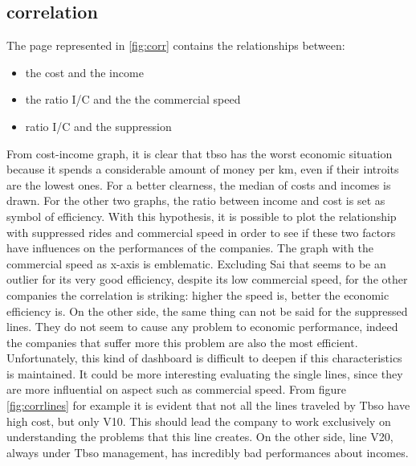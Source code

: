 \subsection{correlation}
The page represented in \ref{fig:corr} contains the relationships between:
\begin{itemize}
  \item the cost and the income
   \item the ratio I/C and the the commercial speed
    \item ratio I/C and the suppression
\end{itemize}
From cost-income graph, it is clear that tbso has the worst economic situation because it spends a considerable amount of money per km, even if their introits are the lowest ones. For a better clearness, the median of costs and incomes is drawn.
For the other two graphs, the ratio between income and cost is set as symbol of efficiency. With this hypothesis, it is possible to plot the relationship with suppressed rides and commercial speed in order to see if these two factors have influences on the performances of the companies. 
The graph with the commercial speed as x-axis is emblematic. Excluding Sai that seems to be an outlier for its very good efficiency, despite its low commercial speed, for the other companies the correlation is striking: higher the speed is, better the economic efficiency is. 
On the other side, the same thing can not be said for the suppressed lines. They do not seem to cause any problem to economic performance, indeed the companies that suffer more this problem are also the most efficient.
Unfortunately, this kind of dashboard is difficult to deepen if this characteristics is maintained. It could be more interesting evaluating the single lines, since they are more influential on aspect such as commercial speed. From figure \ref{fig:corrlines} for example it is evident that not all the lines traveled by Tbso have high cost, but only V10. This should lead the company to work exclusively on understanding the problems that this line creates. On the other side, line V20, always under Tbso management, has incredibly bad performances about incomes. 




\newpage
\begin{landscape}
\thispagestyle{empty}

\end{landscape}
\newpage


